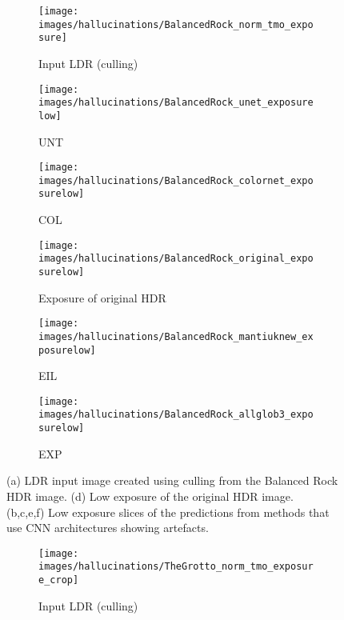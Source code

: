 \documentclass{egpubl}
\begin{document}
 \begin{figure*}[htb]
    \centering
    \begin{subfigure}[t]{0.27\linewidth}
        \centering
        \texttt{[image: images/hallucinations/BalancedRock\_norm\_tmo\_exposure]}
        \caption{Input LDR (culling)}
    \end{subfigure}
    \begin{subfigure}[t]{0.27\linewidth}
        \centering
        \texttt{[image: images/hallucinations/BalancedRock\_unet\_exposurelow]}
        \caption{UNT}
    \end{subfigure}
    \begin{subfigure}[t]{0.27\linewidth}
        \centering
        \texttt{[image: images/hallucinations/BalancedRock\_colornet\_exposurelow]}
        \caption{COL}
    \end{subfigure}
    \begin{subfigure}[t]{0.27\linewidth}
        \centering
        \texttt{[image: images/hallucinations/BalancedRock\_original\_exposurelow]}
        \caption{Exposure of original HDR}
    \end{subfigure}
    \begin{subfigure}[t]{0.27\linewidth}
        \centering
        \texttt{[image: images/hallucinations/BalancedRock\_mantiuknew\_exposurelow]}
        \caption{EIL}
    \end{subfigure}
    \begin{subfigure}[t]{0.27\linewidth}
        \centering
        \texttt{[image: images/hallucinations/BalancedRock\_allglob3\_exposurelow]}
        \caption{EXP}
    \end{subfigure}
    \caption{(a) LDR input image created using culling from the Balanced Rock HDR image. (d) Low exposure of the
    original HDR image.\\(b,c,e,f) Low exposure slices of the predictions from methods that use CNN architectures
    showing artefacts.}\label{fig:hallucinations_low}
\end{figure*}  \begin{figure*}[htb]
    \centering
    \begin{subfigure}[t]{0.28\linewidth}
        \centering
        \texttt{[image: images/hallucinations/TheGrotto\_norm\_tmo\_exposure\_crop]}
        \caption{Input LDR (culling)}
    \end{subfigure}
    \begin{subfigure}[t]{0.28\linewidth}

\end{subfigure}
\end{figure*}
\end{document}
